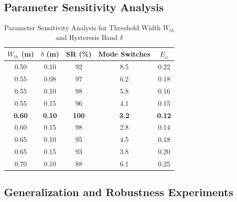 \documentclass[lettersize,journal]{IEEEtran}
\begin{document}
\subsection{Parameter Sensitivity Analysis}

\begin{table}[htbp]
\centering
\caption{Parameter Sensitivity Analysis for Threshold Width $W_{th}$ and Hysteresis Band $\delta$}
\label{tab:param_sensitivity}
\begin{tabular}{cc|ccc}
\hline
\textbf{$W_{th}$ (m)} & \textbf{$\delta$ (m)} & \textbf{SR (\%)} & \textbf{Mode Switches} & \textbf{$E_{\dot{\omega}}$} \\
\hline
0.50 & 0.10 & 92 & 8.5 & 0.22 \\
0.55 & 0.08 & 97 & 6.2 & 0.18 \\
0.55 & 0.10 & 98 & 5.8 & 0.16 \\
0.55 & 0.15 & 96 & 4.1 & 0.15 \\
\textbf{0.60} & \textbf{0.10} & \textbf{100} & \textbf{3.2} & \textbf{0.12} \\
0.60 & 0.15 & 98 & 2.8 & 0.14 \\
0.65 & 0.10 & 95 & 4.5 & 0.18 \\
0.65 & 0.15 & 93 & 3.8 & 0.20 \\
0.70 & 0.10 & 88 & 6.1 & 0.25 \\
\hline
\end{tabular}
\end{table}

\subsection{Generalization and Robustness Experiments}
\end{document}
